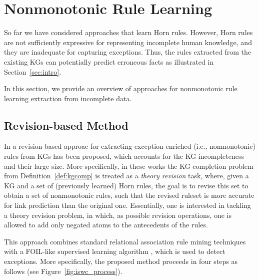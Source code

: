\section{Nonmonotonic Rule Learning}\label{sec:nmrulelearn}
So far we have considered approaches that learn Horn rules. However,  Horn rules are not sufficiently expressive for representing incomplete human knowledge, and they are inadequate for capturing
exceptions. Thus, the rules extracted from the existing KGs can potentially %
predict erroneous facts as illustrated in Section~\ref{sec:intro}. 

In this section, we provide an overview of approaches for nonmonotonic rule learning extraction from incomplete data. 

\subsection{Revision-based Method}
In \cite{DBLP:conf/semweb/Gad-ElrabSUW16,ilp2016} a revision-based approac for extracting exception-enriched (i.e., nonmonotonic)  rules from KGs has been proposed, which accounts for the KG incompleteness and their large size. 
More specifically, in these works the KG completion problem from Definition~\ref{def:kgcomp} is treated 
as a \emph{theory revision} task, where, given a KG and a set of (previously learned) Horn rules, the goal is to revise this set to obtain a set of nonmonotonic rules, such that the revised ruleset is more accurate for link prediction than the original one. Essentially, one is interested in tackling a theory revision problem, in which, as possible revision operations, one is allowed to add only negated atoms to the antecedents of the rules. 

This approach combines standard relational association rule mining techniques with a FOIL-like supervised learning algorithm \cite{foil}, which is used to detect exceptions. More specifically, the proposed method proceeds in four steps as follows (see Figure~\ref{fig:iswc_process}).


